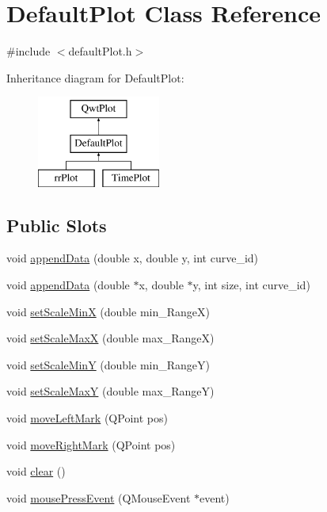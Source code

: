 \hypertarget{class_default_plot}{\section{Default\+Plot Class Reference}
\label{class_default_plot}
}


{\ttfamily \#include $<$default\+Plot.\+h$>$}

Inheritance diagram for Default\+Plot\+:\begin{figure}[H]
\begin{center}
\leavevmode
\includegraphics[height=3.000000cm]{class_default_plot}
\end{center}
\end{figure}
\subsection*{Public Slots}
\begin{DoxyCompactItemize}
\item 
void \hyperlink{class_default_plot_a854d9542172051ce35f1a0c4feb53f33}{append\+Data} (double x, double y, int curve\+\_\+id)
\item 
void \hyperlink{class_default_plot_acff90f7cdbbd829abfca06ed24507da7}{append\+Data} (double $\ast$x, double $\ast$y, int size, int curve\+\_\+id)
\item 
void \hyperlink{class_default_plot_a1b738fc1cee258914b5cccbd63131ace}{set\+Scale\+Min\+X} (double min\+\_\+\+Range\+X)
\item 
void \hyperlink{class_default_plot_adb1b7d66e42b376734a4e2be176f3382}{set\+Scale\+Max\+X} (double max\+\_\+\+Range\+X)
\item 
void \hyperlink{class_default_plot_aa0924bd27c05af6d656301afe2e25851}{set\+Scale\+Min\+Y} (double min\+\_\+\+Range\+Y)
\item 
void \hyperlink{class_default_plot_aebaa780d70e4b8fe39a83da2939ea2b2}{set\+Scale\+Max\+Y} (double max\+\_\+\+Range\+Y)
\item 
void \hyperlink{class_default_plot_a64d7ce1a40eb783f9ebc34b8f5229fca}{move\+Left\+Mark} (Q\+Point pos)
\item 
void \hyperlink{class_default_plot_ab61e442a78117779faf7594af03352fa}{move\+Right\+Mark} (Q\+Point pos)
\item 
void \hyperlink{class_default_plot_ad5983e28b973fa6050d1d38243c4d18d}{clear} ()
\item 
void \hyperlink{class_default_plot_a1ece166f6f9da202fbbbd87a3276ec91}{mouse\+Press\+Event} (Q\+Mouse\+Event $\ast$event)
\end{DoxyCompactItemize}
